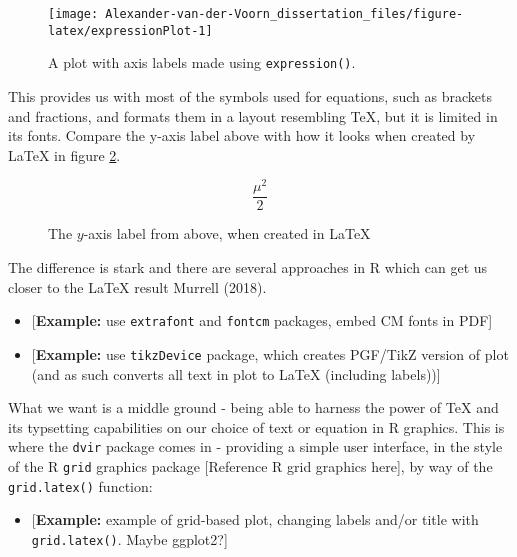 \documentclass[]{article}
\providecommand{\tightlist}{%
  \setlength{\itemsep}{0pt}\setlength{\parskip}{0pt}}
\begin{document}
\begin{figure}

{\centering \texttt{[image: Alexander-van-der-Voorn\_dissertation\_files/figure-latex/expressionPlot-1]} 

}

\caption{A plot with axis labels made using \texttt{expression()}.}\label{fig:expressionPlot}
\end{figure}

This provides us with most of the symbols used for equations, such as
brackets and fractions, and formats them in a layout resembling \TeX{},
but it is limited in its fonts. Compare the y-axis label above with how
it looks when created by \LaTeX{} in figure \ref{muOver2}.

\begin{figure}\label{muOver2}
\begin{equation*}
\dfrac{\mu^2}{2}
\end{equation*}
\caption{The \(y\)-axis label from above, when created in \LaTeX}
\end{figure}

The difference is stark and there are several approaches in R which can
get us closer to the \LaTeX{} result Murrell (2018).

\begin{itemize}
\item
  {[}\textbf{Example:} use \texttt{extrafont} and \texttt{fontcm}
  packages, embed CM fonts in PDF{]}
\item
  {[}\textbf{Example:} use \texttt{tikzDevice} package, which creates
  PGF/TikZ version of plot (and as such converts all text in plot to
  LaTeX (including labels)){]}
\end{itemize}

What we want is a middle ground - being able to harness the power of
\TeX{} and its typsetting capabilities on our choice of text or equation
in R graphics. This is where the \texttt{dvir} package comes in -
providing a simple user interface, in the style of the R \texttt{grid}
graphics package {[}Reference R grid graphics here{]}, by way of the
\texttt{grid.latex()} function:

\begin{itemize}
\tightlist
\item
  {[}\textbf{Example:} example of grid-based plot, changing labels
  and/or title with \texttt{grid.latex()}. Maybe ggplot2?{]}
\end{itemize}
\end{document}
